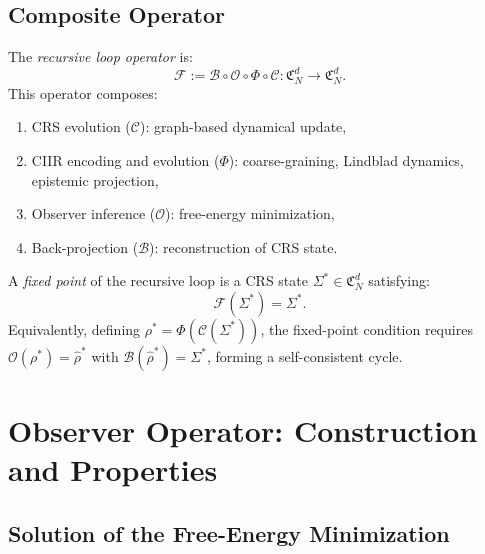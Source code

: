 \subsection{Composite Operator}

\begin{definition}\label{def:13.5}
The \emph{recursive loop operator} is:
\begin{equation}\label{eq:loop-op}
  \mathcal{F} := \mathcal{B} \circ \mathcal{O} \circ \Phi \circ \mathcal{C}
  : \mathfrak{C}_N^d \to \mathfrak{C}_N^d.
\end{equation}
This operator composes:
\begin{enumerate}
  \item CRS evolution ($\mathcal{C}$): graph-based dynamical update,
  \item CIIR encoding and evolution ($\Phi$): coarse-graining, Lindblad
    dynamics, epistemic projection,
  \item Observer inference ($\mathcal{O}$): free-energy minimization,
  \item Back-projection ($\mathcal{B}$): reconstruction of CRS state.
\end{enumerate}
\end{definition}

\begin{definition}\label{def:13.6}
A \emph{fixed point} of the recursive loop is a CRS state
$\Sigma^* \in \mathfrak{C}_N^d$ satisfying:
\begin{equation}\label{eq:fixed-point}
  \mathcal{F}(\Sigma^*) = \Sigma^*.
\end{equation}
Equivalently, defining $\rho^* = \Phi(\mathcal{C}(\Sigma^*))$, the
fixed-point condition requires $\mathcal{O}(\rho^*) = \hat{\rho}^*$
with $\mathcal{B}(\hat{\rho}^*) = \Sigma^*$, forming a self-consistent
cycle.
\end{definition}

\section{Observer Operator: Construction and Properties}
\label{sec:ch13:observer}

\subsection{Solution of the Free-Energy Minimization}

